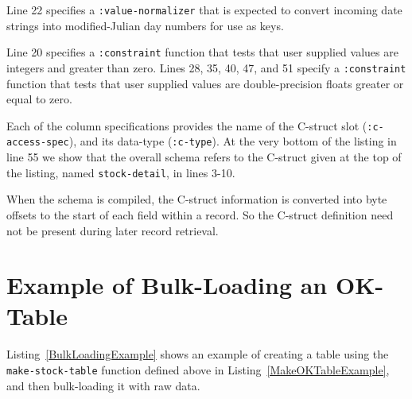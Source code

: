 \documentclass[article,oneside]{memoir}
\begin{document}
Line 22 specifies a \texttt{:value-normalizer} that is expected to convert incoming date strings into modified-Julian day numbers for use as keys.

Line 20 specifies a \texttt{:constraint} function that tests that user supplied values are integers and greater than zero. Lines 28, 35, 40, 47, and 51 specify a \texttt{:constraint} function that tests that user supplied values are double-precision floats greater or equal to zero.

Each of the column specifications provides the name of the C-struct slot (\texttt{:c-access-spec}), and its data-type (\texttt{:c-type}). At the very bottom of the listing in line 55 we show that the overall schema refers to the C-struct given at the top of the listing, named \texttt{stock-detail}, in lines 3-10.

When the schema is compiled, the C-struct information is converted into byte offsets to the start of each field within a record. So the C-struct definition need not be present during later record retrieval.

\section{Example of Bulk-Loading an OK-Table}
\label{BulkLoadingSection}
Listing~\ref{BulkLoadingExample} shows an example of creating a table using the \texttt{make-stock-table} function defined above in Listing~\ref{MakeOKTableExample}, and then bulk-loading it with raw data.
\end{document}
